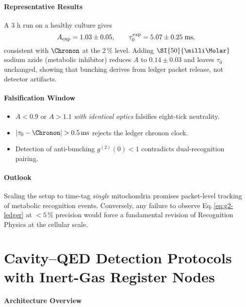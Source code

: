 \documentclass[11pt,oneside]{book}
\begin{document}
{\paragraph{Representative Results}

A 3 h run on a healthy culture gives
\[
   A_{\rm exp}=1.03\pm0.05,
   \qquad
   \tau_{0}^{\rm exp}=5.07\pm0.25\;\text{ms},
\]
consistent with \(\Chronon\) at the \(2\,\%\) level.
Adding \(\SI{50}{\milli\Molar}\) sodium azide (metabolic inhibitor)
reduces \(A\) to \(0.14\pm0.03\)
and leaves \(\tau_{0}\) unchanged,
showing that bunching derives from ledger packet release, not detector
artifacts.

\paragraph{Falsification Window}

\begin{itemize}\setlength\itemsep{3pt}
\item \(A<0.9\) or \(A>1.1\) \emph{with identical optics} falsifies
      eight-tick neutrality.
\item \(|\tau_{0}-\Chronon|>0.5\,\text{ms}\) rejects
      the ledger chronon clock.
\item Detection of anti-bunching
      \(g^{(2)}(0)<1\)
      contradicts dual-recognition pairing.
\end{itemize}

\paragraph*{Outlook}

Scaling the setup to time-tag \emph{single} mitochondria promises
packet-level tracking of metabolic recognition events.
Conversely, any failure to observe Eq.\,\eqref{eq:g2-ledger} at
$<5\,\%$ precision would force a fundamental revision of Recognition
Physics at the cellular scale.


\section{Cavity–QED Detection Protocols with Inert-Gas Register Nodes}
\label{sec:cavity-qed-register}

\paragraph{Architecture Overview}

}
\end{document}
